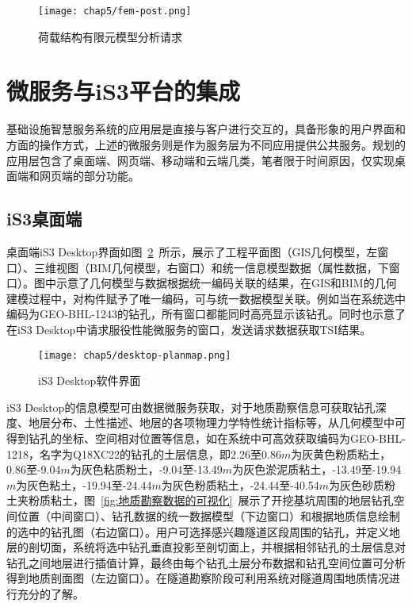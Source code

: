 \begin{figure}[htb!]
    \centering
    \texttt{[image: chap5/fem-post.png]}
    \caption{荷载结构有限元模型分析请求}
    \label{fig:荷载结构有限元模型分析请求}
\end{figure}

\section{微服务与iS3平台的集成}

基础设施智慧服务系统的应用层是直接与客户进行交互的，具备形象的用户界面和方面的操作方式，上述的微服务则是作为服务层为不同应用提供公共服务。规划的应用层包含了桌面端、网页端、移动端和云端几类，笔者限于时间原因，仅实现桌面端和网页端的部分功能。

\subsection{iS3桌面端}

桌面端iS3 Desktop界面如图~\ref{fig:iS3Desktop软件界面}~所示，展示了工程平面图（GIS几何模型，左窗口）、三维视图（BIM几何模型，右窗口）和统一信息模型数据（属性数据，下窗口）。图中示意了几何模型与数据根据统一编码关联的结果，在GIS和BIM的几何建模过程中，对构件赋予了唯一编码，可与统一数据模型关联。例如当在系统选中编码为GEO-BHL-1243的钻孔，所有窗口都能同时高亮显示该钻孔。同时也示意了在iS3 Desktop中请求服役性能微服务的窗口，发送请求数据获取TSI结果。

\begin{figure}[htb!]
    \centering
    \texttt{[image: chap5/desktop-planmap.png]}
    \caption{iS3 Desktop软件界面}
    \label{fig:iS3Desktop软件界面}
\end{figure}

iS3 Desktop的信息模型可由数据微服务获取，对于地质勘察信息可获取钻孔深度、地层分布、土性描述、地层的各项物理力学特性统计指标等，从几何模型中可得到钻孔的坐标、空间相对位置等信息，如在系统中可高效获取编码为GEO-BHL-1218，名字为Q18XC22的钻孔的土层信息，即2.26至0.86$m$为灰黄色粉质粘土，0.86至-9.04$m$为灰色粘质粉土，-9.04至-13.49$m$为灰色淤泥质粘土，-13.49至-19.94$m$为灰色粘土，-19.94至-24.44$m$为灰色粉质粘土，-24.44至-40.54$m$为灰色砂质粉土夹粉质粘土，图~\ref{fig:地质勘察数据的可视化}~展示了开挖基坑周围的地层钻孔空间位置（中间窗口）、钻孔数据的统一数据模型（下边窗口）和根据地质信息绘制的选中的钻孔图（右边窗口）。用户可选择感兴趣隧道区段周围的钻孔，并定义地层的剖切面，系统将选中钻孔垂直投影至剖切面上，并根据相邻钻孔的土层信息对钻孔之间地层进行插值计算，最终由每个钻孔土层分布数据和钻孔空间位置可分析得到地质剖面图（左边窗口）。在隧道勘察阶段可利用系统对隧道周围地质情况进行充分的了解。


